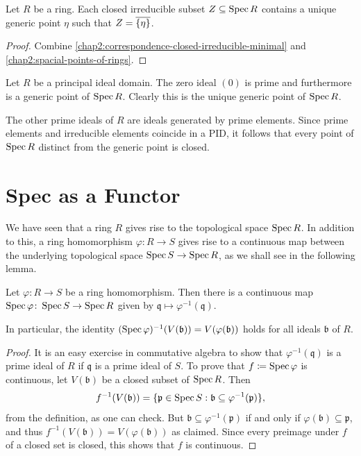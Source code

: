 \begin{corollary}\label{chap2:closed-irreducible-subset-of-affine-has-unique-generic-point}
	Let $R$ be a ring. Each closed irreducible subset $Z \subseteq \operatorname{Spec} R$ contains a unique generic point $\eta$ such that $Z = \overline{\lbrace\eta\rbrace}$.
\end{corollary}
\begin{proof}
	Combine \cref{chap2:correspondence-closed-irreducible-minimal} and \cref{chap2:spacial-points-of-rings}.
\end{proof}

\begin{example}
	Let $R$ be a principal ideal domain. The zero ideal $(0)$ is prime and furthermore is a generic point of $\operatorname{Spec} R$. Clearly this is the unique generic point of $\operatorname{Spec} R$.
	
	The other prime ideals of $R$ are ideals generated by prime elements. Since prime elements and irreducible elements coincide in a PID, it follows that every point of $\operatorname{Spec} R$ distinct from the generic point is closed.
\end{example}

\section{Spec as a Functor}

We have seen that a ring $R$ gives rise to the topological space $\operatorname{Spec} R$. In addition to this, a ring homomorphism $\varphi \colon R \to S$ gives rise to a continuous map between the underlying topological space $\operatorname{Spec} S \to \operatorname{Spec} R$, as we shall see in the following lemma.

\begin{lemma}\label{chap2:spec-map-is-continuous}
	Let $\varphi \colon R \to S$ be a ring homomorphism. Then there is a continuous map $\operatorname{Spec} \varphi \colon \operatorname{Spec} S \to \operatorname{Spec} R$ given by $\mathfrak{q}  \mapsto \varphi^{-1}(\mathfrak{q})$. 
	
	In particular, the identity $(\operatorname{Spec} \varphi)^{-1}(V(\mathfrak{b})) = V(\varphi(\mathfrak{b}))$ holds for all ideals $\mathfrak{b}$ of $R$.
\end{lemma}
\begin{proof}
	It is an easy exercise in commutative algebra to show that $\varphi^{-1}(\mathfrak{q})$ is a prime ideal of $R$ if $\mathfrak{q}$ is a prime ideal of $S$. To prove that $f \coloneqq \operatorname{Spec} \varphi$ is continuous, let $V(\mathfrak{b})$ be a closed subset of $\operatorname{Spec} R$. Then
	\begin{equation*}
		f^{-1}(V(\mathfrak{b})) = \lbrace\mathfrak{p} \in \operatorname{Spec} S : \mathfrak{b} \subseteq \varphi^{-1}(\mathfrak{p}) \rbrace,
	\end{equation*}
	from the definition, as one can check. But $\mathfrak{b} \subseteq \varphi^{-1}(\mathfrak{p})$ if and only if $\varphi(\mathfrak{b}) \subseteq \mathfrak{p}$, and thus $f^{-1}(V(\mathfrak{b})) = V(\varphi(\mathfrak{b}))$ as claimed. Since every preimage under $f$ of a closed set is closed, this shows that $f$ is continuous.
\end{proof}

